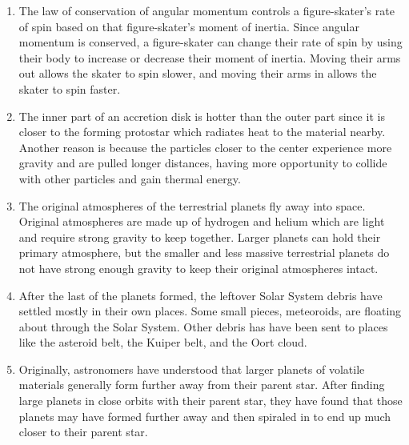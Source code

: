 \documentclass[../hw2.tex]{subfiles}
\begin{document}
    \begin{enumerate}
        \item The law of conservation of angular momentum controls a figure-skater's rate of spin based on that figure-skater's moment of inertia. Since angular momentum is conserved, a figure-skater can change their rate of spin by using their body to increase or decrease their moment of inertia. Moving their arms out allows the skater to spin slower, and moving their arms in allows the skater to spin faster.
        \item The inner part of an accretion disk is hotter than the outer part since it is closer to the forming protostar which radiates heat to the material nearby. Another reason is because the particles closer to the center experience more gravity and are pulled longer distances, having more opportunity to collide with other particles and gain thermal energy.
        \item The original atmospheres of the terrestrial planets fly away into space. Original atmospheres are made up of hydrogen and helium which are light and require strong gravity to keep together. Larger planets can hold their primary atmosphere, but the smaller and less massive terrestrial planets do not have strong enough gravity to keep their original atmospheres intact.
        \item After the last of the planets formed, the leftover Solar System debris have settled mostly in their own places. Some small pieces, meteoroids, are floating about through the Solar System. Other debris has have been sent to places like the asteroid belt, the Kuiper belt, and the Oort cloud.
        \item Originally, astronomers have understood that larger planets of volatile materials generally form further away from their parent star. After finding large planets in close orbits with their parent star, they have found that those planets may have formed further away and then spiraled in to end up much closer to their parent star.
    \end{enumerate}
\end{document}
